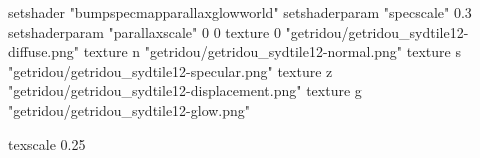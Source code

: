 setshader "bumpspecmapparallaxglowworld"
setshaderparam "specscale" 0.3
setshaderparam "parallaxscale" 0 0
texture 0 "getridou/getridou_sydtile12-diffuse.png"
texture n "getridou/getridou_sydtile12-normal.png"
texture s "getridou/getridou_sydtile12-specular.png"
texture z "getridou/getridou_sydtile12-displacement.png"
texture g "getridou/getridou_sydtile12-glow.png"

texscale 0.25